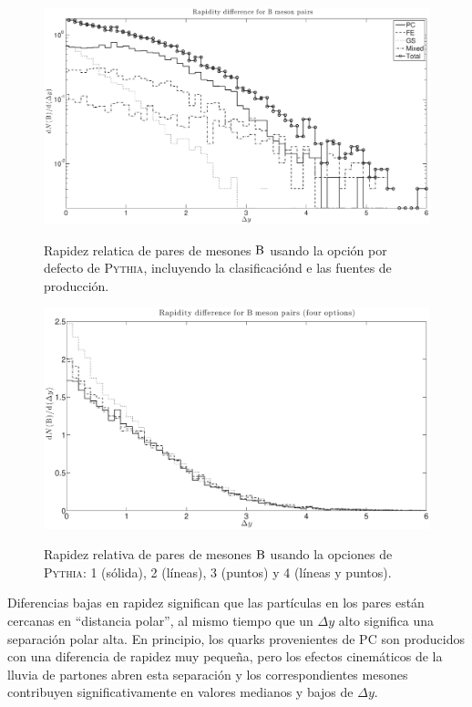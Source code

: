 \begin{figure}[!h]
\centering
\caption[Rapidez relativa de pares de mesones $\B$. Opción por defecto de \textsc{Pythia}.]{Rapidez relatica de pares de mesones $\B$ usando la opción por defecto de \textsc{Pythia}, incluyendo la clasificaciónd e las fuentes de producción.}
\includegraphics[width=15cm]{BBYOp1}
\label{fig:BBYOp1}
\end{figure}

\begin{figure}[!h]
\centering
\caption[[Rapidez relativa de pares de mesones $\B$. Cuatro opciones de \textsc{Pythia}.]{Rapidez relativa de pares de mesones $\B$ usando la opciones de \textsc{Pythia}:  1 (sólida), 2 (líneas), 3 (puntos) y 4 (líneas y puntos).}
\includegraphics[width=15cm]{BBY4Op}
\label{fig:BBY4Op}
\end{figure}

Diferencias bajas en rapidez significan que las partículas en los pares están cercanas en ``distancia polar'', al mismo tiempo que un $\Delta y$ alto significa una separación polar alta. En principio, los quarks provenientes de PC son producidos con una diferencia de rapidez muy pequeña, pero los efectos cinemáticos de la lluvia de partones abren esta separación y los correspondientes mesones contribuyen significativamente en valores medianos y bajos de $\Delta y$.

